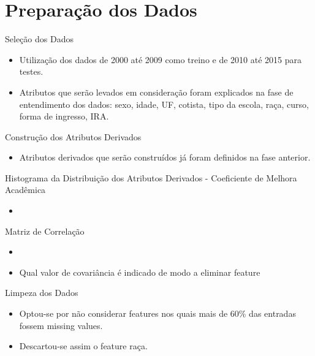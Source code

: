
\section{Preparação dos Dados}
\begin{frame}{Seleção dos Dados}
\begin{itemize}[itemsep=3ex]
    \item Utilização dos dados de 2000 até 2009 como treino e de 2010 até 2015 para
        testes. 
    \item Atributos que serão levados em consideração foram explicados na fase de
        entendimento dos dados: sexo, idade, UF, cotista, tipo da escola, raça,
        curso, forma de ingresso, IRA.
\end{itemize}
\end{frame}

\begin{frame}{Construção dos Atributos Derivados}
\begin{itemize}[itemsep=3ex]
    \item Atributos derivados que serão construídos já foram definidos na fase
        anterior.
\end{itemize}
\end{frame}

\begin{frame}{Histograma da Distribuição dos Atributos Derivados - Coeficiente de
    Melhora Acadêmica}
\begin{itemize}[itemsep=3ex]
        \item <Por histograma aqui>
\end{itemize}
\end{frame}

\begin{frame}{Matriz de Correlação}
\begin{itemize}[itemsep=3ex]
    \item <Por matriz de correlação aqui>
    \item Qual valor de covariância é indicado de modo a eliminar feature
\end{itemize}
\end{frame}

\begin{frame}{Limpeza dos Dados}
\begin{itemize}[itemsep=3ex]
    \item Optou-se por não considerar features nos quais mais de 60\% das entradas
        fossem missing values.
    \item Descartou-se assim o feature raça.
\end{itemize}
\end{frame}

